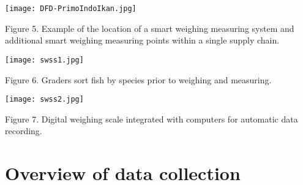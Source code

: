 \begin{center}
\graphicspath{{/root/R-project/IFishSnapperWPP573/Images/}}
\texttt{[image: DFD-PrimoIndoIkan.jpg]}

Figure 5. Example of the location of a smart weighing measuring system and additional smart weighing measuring points within a single supply chain.
\end{center}

\begin{center}
\graphicspath{{/root/R-project/IFishSnapperWPP573/Images/}}
\texttt{[image: swss1.jpg]}

Figure 6. Graders sort fish by species prior to weighing and measuring.
\end{center}

\begin{center}
\graphicspath{{/root/R-project/IFishSnapperWPP573/Images/}}
\texttt{[image: swss2.jpg]}

Figure 7. Digital weighing scale integrated with computers for automatic data recording.
\end{center}

\section{Overview of data collection}

